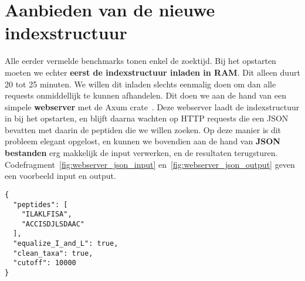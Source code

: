 \section{Aanbieden van de nieuwe indexstructuur}\label{sec:aanbieden-van-de-nieuwe-indexstructuur}
Alle eerder vermelde benchmarks tonen enkel de zoektijd.
Bij het opstarten moeten we echter \textbf{eerst de indexstructuur inladen in RAM}.
Dit alleen duurt 20 tot 25 minuten.
We willen dit inladen slechts eenmalig doen om dan alle requests onmiddellijk te kunnen afhandelen.
Dit doen we aan de hand van een simpele \textbf{webserver} met de Axum crate~\cite{axum}.
Deze webserver laadt de indexstructuur in bij het opstarten, en blijft daarna wachten op HTTP requests die een JSON bevatten met daarin de peptiden die we willen zoeken.
Op deze manier is dit probleem elegant opgelost, en kunnen we bovendien aan de hand van \textbf{JSON bestanden} erg makkelijk de input verwerken, en de resultaten terugsturen.
Codefragment~\ref{fig:webserver_json_input} en~\ref{fig:webserver_json_output} geven een voorbeeld input en output.

\begin{listing}[h!]
    \begin{verbatim}
{
  "peptides": [
    "ILAKLFISA",
    "ACCISDJLSDAAC"
  ],
  "equalize_I_and_L": true,
  "clean_taxa": true,
  "cutoff": 10000
}
    \end{verbatim}
    \caption{Voorbeeld JSON-input voor de webserver waarbij de peptiden \texttt{ILAKLFISA} en \texttt{ACCISDJLSDAAC} gezocht worden.
    Tijdens het zoeken worden I en L gelijkgesteld, en wordt de drempelwaarde B=10 gebruikt.
    Het \texttt{clean\_taxa} argument duidt er op aan dat we enkel eiwitten willen matchen die ook een meerwaarde hebben tijdens de aggregatie fase.
    Welke taxa (en overeenkomstige eiwitten) nuttig zijn tijdens het aggregeren, wordt eerder in de Unipept pipeline beslist.
    De laatste twee argumenten zouden ook weggelaten kunnen worden aangezien de standaardwaardes hier gebruikt worden.}
    \label{fig:webserver_json_input}
\end{listing}


